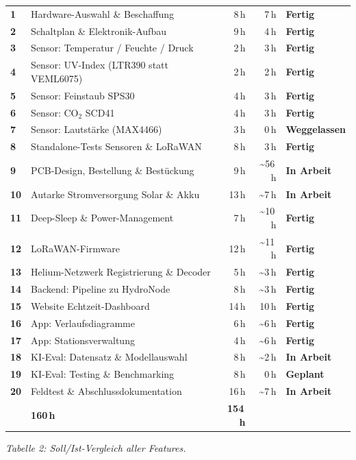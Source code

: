 \documentclass[11pt,a4paper]{scrartcl}
\newcommand{\status}[1]{%
  \ifstrequal{#1}{Fertig}{\textcolor{colgreen}{\textbf{Fertig}}}{}%
  \ifstrequal{#1}{In Arbeit}{\textcolor{colorange}{\textbf{In Arbeit}}}{}%
  \ifstrequal{#1}{Geplant}{\textcolor{colblue}{\textbf{Geplant}}}{}%
  \ifstrequal{#1}{Weggelassen}{\textcolor{colred}{\textbf{Weggelassen}}}{}%
}
\begin{document}
\begin{longtable}{>{\bfseries}p{0.5cm} p{6.5cm} r r l}
  1  & Hardware-Auswahl \& Beschaffung & 8\,h & 7\,h & \status{Fertig} \\
  \rowcolor{rowgray}
  2  & Schaltplan \& Elektronik-Aufbau & 9\,h & 4\,h & \status{Fertig} \\
  3  & Sensor: Temperatur / Feuchte / Druck & 2\,h & 3\,h & \status{Fertig} \\
  \rowcolor{rowgray}
  4  & Sensor: UV-Index (LTR390 statt VEML6075) & 2\,h & 2\,h & \status{Fertig} \\
  5  & Sensor: Feinstaub SPS30 & 4\,h & 3\,h & \status{Fertig} \\
  \rowcolor{rowgray}
  6  & Sensor: CO${}_2$ SCD41 & 4\,h & 3\,h & \status{Fertig} \\
  7  & Sensor: Lautstärke (MAX4466) & 3\,h & 0\,h & \status{Weggelassen} \\
  \rowcolor{rowgray}
  8  & Standalone-Tests Sensoren \& LoRaWAN & 8\,h & 3\,h & \status{Fertig} \\
  9  & PCB-Design, Bestellung \& Bestückung & 9\,h & \textasciitilde56\,h & \status{In Arbeit} \\
  \rowcolor{rowgray}
  10 & Autarke Stromversorgung Solar \& Akku & 13\,h & \textasciitilde7\,h & \status{In Arbeit} \\
  11 & Deep-Sleep \& Power-Management & 7\,h & \textasciitilde10\,h & \status{Fertig} \\
  \rowcolor{rowgray}
  12 & LoRaWAN-Firmware & 12\,h & \textasciitilde11\,h & \status{Fertig} \\
  13 & Helium-Netzwerk Registrierung \& Decoder & 5\,h & \textasciitilde3\,h & \status{Fertig} \\
  \rowcolor{rowgray}
  14 & Backend: Pipeline zu HydroNode & 8\,h & \textasciitilde3\,h & \status{Fertig} \\
  15 & Website Echtzeit-Dashboard & 14\,h & 10\,h & \status{Fertig} \\
  \rowcolor{rowgray}
  16 & App: Verlaufsdiagramme & 6\,h & \textasciitilde6\,h & \status{Fertig} \\
  17 & App: Stationsverwaltung & 4\,h & \textasciitilde6\,h & \status{Fertig} \\
  \rowcolor{rowgray}
  18 & KI-Eval: Datensatz \& Modellauswahl & 8\,h & \textasciitilde2\,h & \status{In Arbeit} \\
  19 & KI-Eval: Testing \& Benchmarking & 8\,h & 0\,h & \status{Geplant} \\
  \rowcolor{rowgray}
  20 & Feldtest \& Abschlussdokumentation & 16\,h & \textasciitilde7\,h & \status{In Arbeit} \\
  \midrule
  \multicolumn{2}{l}{\textbf{Gesamt (inkl.\ 3D-Gehäuse, nicht geplant)}} & \textbf{160\,h} & \textbf{154\,h} & \\
\end{longtable}
\vspace{-1em}
\begin{center}
  \small\textit{Tabelle 2: Soll/Ist-Vergleich aller Features.}
  \label{tab:vergleich}
\end{center}
\end{document}
